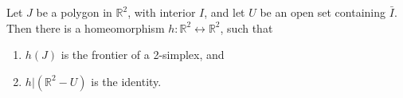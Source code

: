 Let $J$ be a polygon in $\mathbb{R}^2$, with interior $I$, and let $U$ be an open set containing $\bar{I}$. Then there is a homeomorphism $h: \mathbb{R}^2 \leftrightarrow \mathbb{R}^2$, such that
\begin{enumerate}
  \item $h(J)$ is the frontier of a 2-simplex, and
  \item $h|(\mathbb{R}^2 - U)$ is the identity.
\end{enumerate}
